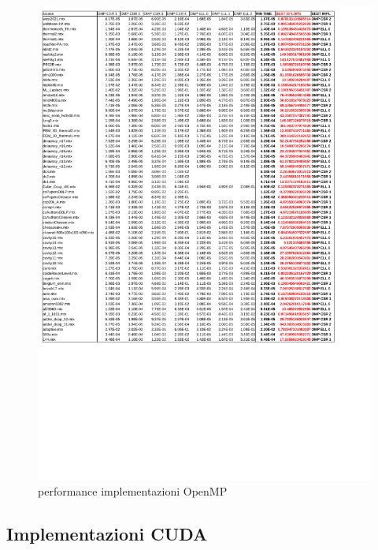 \documentclass[acmsmall,nonacm=true]{acmart}
\begin{document}
\begin{figure}[h]	\label{ompNew_10x4_RL_NOSIMD_ImplConfrontoOut}
    \centering
    \includegraphics[scale=0.55]{ompNew_10x4_RL_NOSIMD_ImplConfrontoOut.pdf}
    \caption{performance implementazioni OpenMP}
\end{figure}

\clearpage

\subsection{Implementazioni CUDA}
\end{document}
